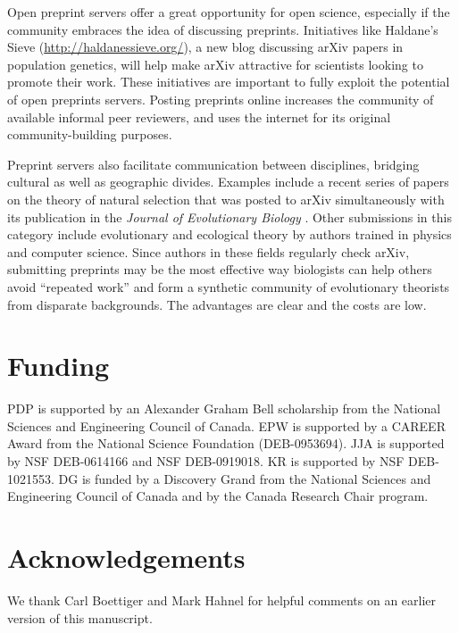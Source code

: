 \documentclass[letterpaper,twocolumn,superscriptaddress,showkeys,longbibliography]{revtex4-1}
\begin{document}
Open preprint servers offer a great opportunity for open science, especially if
the community embraces the idea of discussing preprints. Initiatives like
Haldane's Sieve (\href{http://haldanessieve.org/}{http://haldanessieve.org/}), a
new blog discussing arXiv papers in population genetics, will help make arXiv
attractive for scientists looking to promote their work. These initiatives are
important to fully exploit the potential of open preprints servers. Posting
preprints online increases the community of available informal peer reviewers,
and uses the internet for its original community-building purposes.

Preprint servers also facilitate communication between disciplines, bridging
cultural as well as geographic divides. Examples include a recent series of
papers on the theory of natural selection that was posted to arXiv
simultaneously with its publication in the \emph{Journal of Evolutionary
Biology} \cite{JEB:JEB2431,JEB:JEB2498,JEB:JEB2378,JEB:JEB2373}. Other
submissions in this category include evolutionary and ecological theory by
authors trained in physics and computer science.  Since authors in these fields
regularly check arXiv, submitting preprints may be the most effective way
biologists can help others avoid ``repeated work'' \cite{de2011contribution} and
form a synthetic community of evolutionary theorists from disparate backgrounds.
The advantages are clear and the costs are low.

\section{Funding}

PDP is supported by an Alexander Graham Bell scholarship from the National
Sciences and Engineering Council of Canada. EPW is supported by a CAREER Award
from the National Science Foundation (DEB-0953694). JJA is supported by NSF
DEB-0614166 and NSF DEB-0919018. KR is supported by NSF DEB-1021553. DG is
funded by a Discovery Grand from the National Sciences and Engineering Council
of Canada and by the Canada Research Chair program.

\section{Acknowledgements}

We thank Carl Boettiger and Mark Hahnel for helpful comments on an earlier
version of this manuscript.

\newpage

\end{document}
